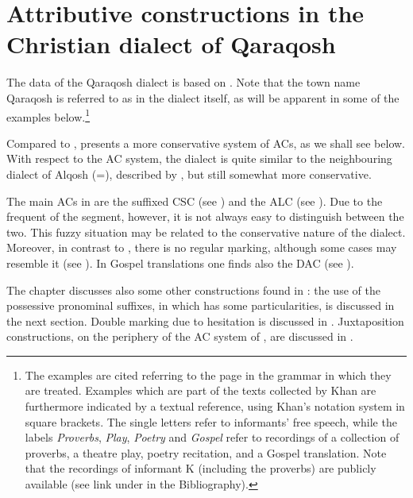 







\chapter{Attributive constructions in the Christian dialect of Qaraqosh} \label{ch:Qaraqosh}

\renewcommand{\defaultDialect}{\Qar}

The data of the Qaraqosh dialect is based on \citet{KhanQaraqosh}. Note that the town name Qaraqosh is referred to as  in the dialect itself, as will be apparent in some of the examples below.\footnote{The examples are cited referring to the page in the grammar in which they are treated. Examples which are part of the texts collected by Khan are furthermore indicated by a  textual reference, using Khan's notation system in square brackets. The single letters refer to informants' free speech, while the labels \textit{Proverbs}, \textit{Play}, \textit{Poetry} and \textit{Gospel} refer to recordings of a collection of proverbs, a theatre play, poetry recitation, and a Gospel translation. Note that the recordings of informant K (including the proverbs) are publicly available (see link under \cite{KhanQaraqosh} in the Bibliography).}

 Compared to \JZax, \Qar presents a more conservative system of ACs, as we shall see below. With respect to the AC system, the dialect is quite similar to the neighbouring dialect of Alqosh (=\Alq), described by \citet{CoghillAlqosh}, but still somewhat more conservative. 

The main ACs in \Qar are the  suffixed CSC (see ) and the ALC (see ). Due to the frequent  of the  segment, however, it is not always easy to distinguish between the two. This fuzzy situation may be related to the conservative nature of the dialect. Moreover, in contrast to \JZax, there is no regular \gen* \d marking, although some cases may resemble it (see ). In Gospel translations one finds also the DAC (see ). 

The chapter discusses also some other constructions found in \Qar: the use of the possessive pronominal suffixes, in which \Qar has some particularities, is discussed in the next section. Double marking due to hesitation is discussed in . Juxtaposition constructions, on the periphery of the AC system of \Qar, are discussed in .


